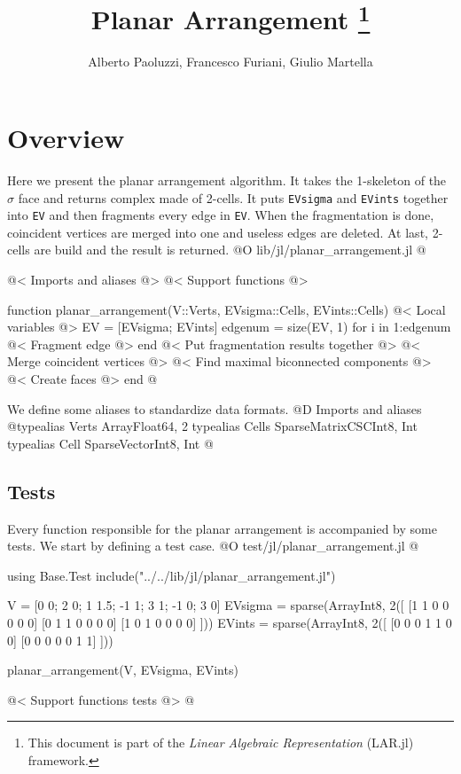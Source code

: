 \documentclass[10pt,oneside]{article}
\author{Alberto Paoluzzi, Francesco Furiani, Giulio Martella}
\title{Planar Arrangement
\footnote{This document is part of the \emph{Linear Algebraic Representation} (LAR.jl) framework.}
}
\begin{document}
\maketitle
\newpage
\tableofcontents
\newpage









\section{Overview}
Here we present the planar arrangement algorithm. It takes the 1-skeleton of the $\sigma$ face and returns complex made of 2-cells.
It puts \texttt{EVsigma} and \texttt{EVints} together into \texttt{EV} and then fragments every edge in \texttt{EV}. 
When the fragmentation is done, coincident vertices are merged into one and useless edges are deleted. At last,
2-cells are build and the result is returned.
@O lib/jl/planar_arrangement.jl
@{@< Imports and aliases @>
@< Support functions @>

function planar_arrangement(V::Verts, EVsigma::Cells, EVints::Cells)
    @< Local variables @>
    EV = [EVsigma; EVints]
    edgenum = size(EV, 1)
    for i in 1:edgenum
        @< Fragment edge @>
    end
    @< Put fragmentation results together @>
    @< Merge coincident vertices @>
    @< Find maximal biconnected components @>
    @< Create faces @>
end 
@}
We define some aliases to standardize data formats.
@D Imports and aliases
@{typealias Verts Array{Float64, 2}
typealias Cells SparseMatrixCSC{Int8, Int}
typealias Cell SparseVector{Int8, Int}
@}
\subsection{Tests}
Every function responsible for the planar arrangement is accompanied by some tests.
We start by defining a test case.
@O test/jl/planar_arrangement.jl
@{using Base.Test
include("../../lib/jl/planar_arrangement.jl")

V = [0 0; 2 0; 1 1.5; -1 1; 3 1; -1 0; 3 0]
EVsigma = sparse(Array{Int8, 2}([
    [1 1 0 0 0 0 0]
    [0 1 1 0 0 0 0]
    [1 0 1 0 0 0 0]
]))
EVints = sparse(Array{Int8, 2}([
    [0 0 0 1 1 0 0]
    [0 0 0 0 0 1 1]
]))

planar_arrangement(V, EVsigma, EVints)

@< Support functions tests @>
@}
\end{document}
